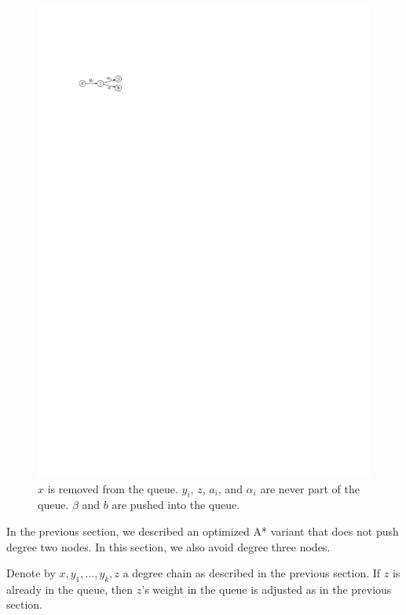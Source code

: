 \documentclass[sigconf]{acmart}
\begin{document}
\begin{figure}

\begin{center}
\includegraphics{push-deg3}
\end{center}

\caption{$x$ is removed from the queue. $y_i$, $z$, $a_i$, and $\alpha_i$ are never part of the queue. $\beta$ and $b$ are pushed into the queue.}
\label{fig:push-deg3}

\end{figure}


In the previous section, we described an optimized A* variant that does not push degree two nodes.
In this section, we also avoid degree three nodes.

Denote by $x,y_1,\ldots, y_k, z$ a degree chain as described in the previous section.
If $z$ is already in the queue, then $z$'s weight in the queue is adjusted as in the previous section.
\end{document}
